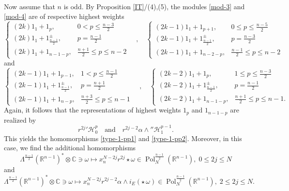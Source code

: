 \documentclass[a4paper,12pt,reqno]{amsart}
\numberwithin{theorem}{subsection}
\numberwithin{equation}{section}
\begin{document}
Now assume that $n$ is odd. By Proposition \ref{IT}/(4),(5), the modules
\eqref{mod-3} and \eqref{mod-4} are of respective highest weights
$$
   \begin{cases}
   (2k) 1_1 + 1_p, & 0 < p \le \frac{n-3}{2} \\
   (2k) 1_1 + 1_{\frac{n-1}{2}}^\pm, & p = \frac{n-1}{2} \\
   (2k) 1_1 + 1_{n-1-p}, & \frac{n+1}{2} \le p \le n-2
   \end{cases}
   \quad , \quad
   \begin{cases}
   (2k-1) 1_1 + 1_{p+1}, & 0 \le p \le \frac{n-5}{2} \\
   (2k-1) 1_1 + 1_{\frac{n-1}{2}}^\pm, & p = \frac{n-3}{2} \\
   (2k-1) 1_1 + 1_{n-2-p}, & \frac{n-1}{2} \le p \le n-2
   \end{cases}
$$
and
$$
   \begin{cases}
   (2k-1) 1_1 + 1_{p-1}, & 1 < p \le \frac{n-1}{2} \\
   (2k-1) 1_1 + 1_{\frac{n-1}{2}}^\pm, & p = \frac{n+1}{2} \\
   (2k-1) 1_1 + 1_{n-p}, & \frac{n+3}{2} \le p \le n-1
   \end{cases}
   \quad , \quad
   \begin{cases}
   (2k-2) 1_1 + 1_p, & 1 \le p \le \frac{n-3}{2} \\
   (2k-2) 1_1 + 1_{\frac{n-1}{2}}^\pm, & p = \frac{n-1}{2} \\
   (2k-2) 1_1 + 1_{n-1-p}, & \frac{n+1}{2} \le p \le n-1.
   \end{cases}
$$
Again, it follows that the representations of highest weights $1_p$ and
$1_{n-1-p}$ are realized by
$$
   r^{2j} {'{\mathcal H}}_0^p \quad \mbox{and} \quad r^{2j-2} \alpha \wedge {''{\mathcal H}}_1^{p-1}.
$$
This yields the homomorphisms \eqref{type-1-pp1} and \eqref{type-1-pp2}.
Moreover, in this case, we find the additional homomorphisms
\begin{equation}\label{exotic-7}
   \Lambda^{\frac{n-1}{2}}({\mathbb{R}}^{n-1})^* \otimes {\mathbb{C}} \ni \omega \mapsto x_n^{N-2j} r^{2j}
   \star \omega \in {\operatorname{Pol}}_N^{\frac{n-1}{2}}({\mathbb{R}}^{n-1}), \; 0 \le 2j \le N
\end{equation}
and
\begin{equation}\label{exotic-8}
   \Lambda^{\frac{n-1}{2}}({\mathbb{R}}^{n-1})^* \otimes {\mathbb{C}} \ni \omega
   \mapsto x_n^{N-2j} r^{2j-2} \alpha \wedge i_E (\star \, \omega) \in
   {\operatorname{Pol}}_N^{\frac{n-1}{2}}({\mathbb{R}}^{n-1}), \; 2 \le 2j \le N.
\end{equation}
\end{document}
